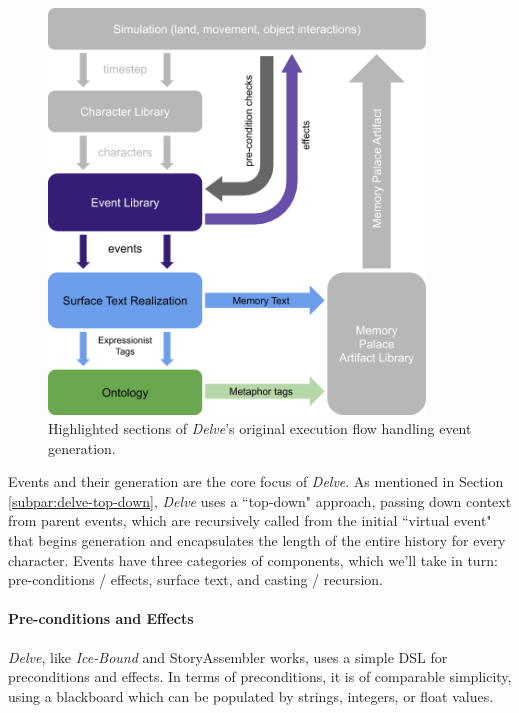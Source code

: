 \begin{figure}
    \centering
    \includegraphics[width=10cm]{figures/4-Delve/delve-diagram-highlight.png}
    \caption{Highlighted sections of \textit{Delve}'s original execution flow handling event generation.}
    \label{fig:diagram-highlighted}
\end{figure}


Events and their generation are the core focus of \textit{Delve}. As mentioned in Section \ref{subpar:delve-top-down}, \textit{Delve} uses a ``top-down" approach, passing down context from parent events, which are recursively called from the initial ``virtual event" that begins generation and encapsulates the length of the entire history for every character. Events have three categories of components, which we'll take in turn: pre-conditions / effects, surface text, and casting / recursion.

\paragraph{Pre-conditions and Effects}\label{par:delve-pre-conditions-and-effects}

\textit{Delve}, like \textit{Ice-Bound} and StoryAssembler works, uses a simple DSL for preconditions and effects. In terms of preconditions, it is of comparable simplicity, using a blackboard which can be populated by strings, integers, or float values.


